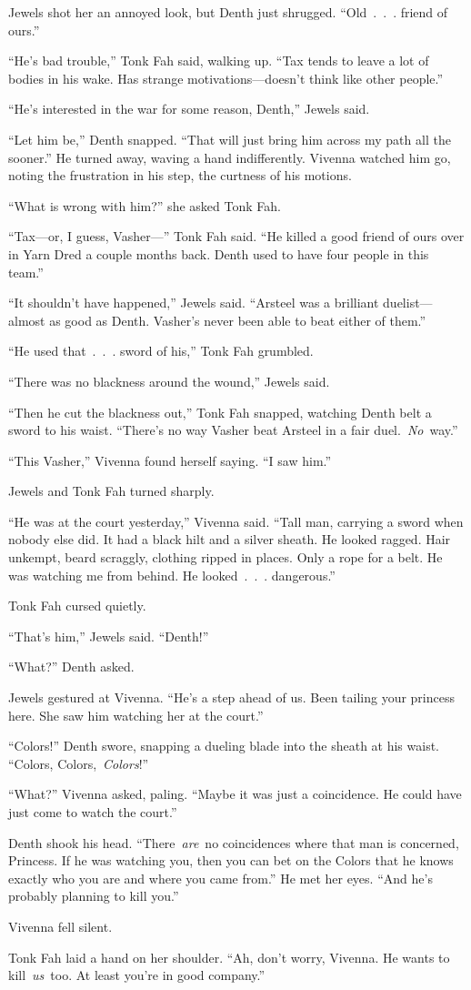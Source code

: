 Jewels shot her an annoyed look, but Denth just shrugged. “Old~.~.~. friend of ours.”

“He’s bad trouble,” Tonk Fah said, walking up. “Tax tends to leave a lot of bodies in his wake. Has strange motivations—doesn’t think like other people.”

“He’s interested in the war for some reason, Denth,” Jewels said.

“Let him be,” Denth snapped. “That will just bring him across my path all the sooner.” He turned away, waving a hand indifferently. Vivenna watched him go, noting the frustration in his step, the curtness of his motions.

“What is wrong with him?” she asked Tonk Fah.

“Tax—or, I guess, Vasher—” Tonk Fah said. “He killed a good friend of ours over in Yarn Dred a couple months back. Denth used to have four people in this team.”

“It shouldn’t have happened,” Jewels said. “Arsteel was a brilliant duelist—almost as good as Denth. Vasher’s never been able to beat either of them.”

“He used that~.~.~. sword of his,” Tonk Fah grumbled.

“There was no blackness around the wound,” Jewels said.

“Then he cut the blackness out,” Tonk Fah snapped, watching Denth belt a sword to his waist. “There’s no way Vasher beat Arsteel in a fair duel.~\textit{No}~way.”

“This Vasher,” Vivenna found herself saying. “I saw him.”

Jewels and Tonk Fah turned sharply.

“He was at the court yesterday,” Vivenna said. “Tall man, carrying a sword when nobody else did. It had a black hilt and a silver sheath. He looked ragged. Hair unkempt, beard scraggly, clothing ripped in places. Only a rope for a belt. He was watching me from behind. He looked~.~.~. dangerous.”

Tonk Fah cursed quietly.

“That’s him,” Jewels said. “Denth!”

“What?” Denth asked.

Jewels gestured at Vivenna. “He’s a step ahead of us. Been tailing your princess here. She saw him watching her at the court.”

“Colors!” Denth swore, snapping a dueling blade into the sheath at his waist. “Colors, Colors,~\textit{Colors}!”

“What?” Vivenna asked, paling. “Maybe it was just a coincidence. He could have just come to watch the court.”

Denth shook his head. “There~\textit{are}~no coincidences where that man is concerned, Princess. If he was watching you, then you can bet on the Colors that he knows exactly who you are and where you came from.” He met her eyes. “And he’s probably planning to kill you.”

Vivenna fell silent.

Tonk Fah laid a hand on her shoulder. “Ah, don’t worry, Vivenna. He wants to kill~\textit{us}~too. At least you’re in good company.”


